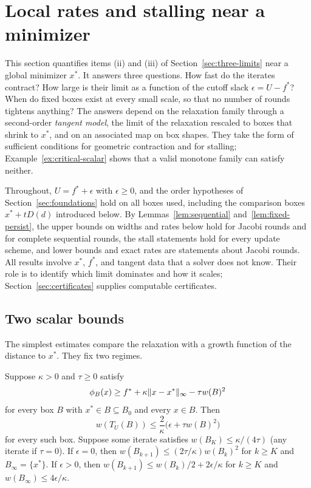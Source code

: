 \section{Local rates and stalling near a minimizer}\label{sec:local-rates}

This section quantifies items (ii) and (iii) of
Section~\ref{sec:three-limits} near a global minimizer $x^*$. It answers
three questions. How fast do the iterates contract? How large is their
limit as a function of the cutoff slack $\epsilon=U-f^*$? When do fixed
boxes exist at every small scale, so that no number of rounds tightens
anything? The answers depend on the relaxation family through a
second-order \emph{tangent model}, the limit of the relaxation rescaled to
boxes that shrink to $x^*$, and on an associated map on box shapes. They
take the form of sufficient conditions for geometric contraction and for
stalling; Example~\ref{ex:critical-scalar} shows that a valid monotone
family can satisfy neither.

Throughout, $U=f^*+\epsilon$ with $\epsilon\ge0$, and the order hypotheses
of Section~\ref{sec:foundations} hold on all boxes used, including the
comparison boxes $x^*+tD(d)$ introduced below. By
Lemmas~\ref{lem:sequential} and~\ref{lem:fixed-persist}, the upper bounds
on widths and rates below hold for Jacobi rounds and for complete
sequential rounds, the stall statements hold for every update scheme, and
lower bounds and exact rates are statements about Jacobi rounds. All
results involve $x^*$, $f^*$, and tangent data that a solver does not know.
Their role is to identify which limit dominates and how it scales;
Section~\ref{sec:certificates} supplies computable certificates.

\subsection{Two scalar bounds}\label{sec:local-rates-scalar}

The simplest estimates compare the relaxation with a growth function of
the distance to $x^*$. They fix two regimes.

\begin{proposition}\label{prop:sharp-growth}
Suppose $\kappa>0$ and $\tau\ge0$ satisfy
\begin{equation}\label{eq:sharp-growth}
  \phi_B(x)\ge f^*+\kappa\lVert x-x^*\rVert_\infty-\tau w(B)^2
\end{equation}
for every box $B$ with $x^*\in B\subseteq B_0$ and every $x\in B$. Then
\[
  w(T_U(B))\le\frac{2}{\kappa}\bigl(\epsilon+\tau w(B)^2\bigr)
\]
for every such box. Suppose some iterate satisfies $w(B_K)\le\kappa/(4\tau)$
(any iterate if $\tau=0$). If $\epsilon=0$, then
$w(B_{k+1})\le(2\tau/\kappa)w(B_k)^2$ for $k\ge K$ and $B_\infty=\{x^*\}$.
If $\epsilon>0$, then $w(B_{k+1})\le w(B_k)/2+2\epsilon/\kappa$ for $k\ge K$
and $w(B_\infty)\le4\epsilon/\kappa$.
\end{proposition}

